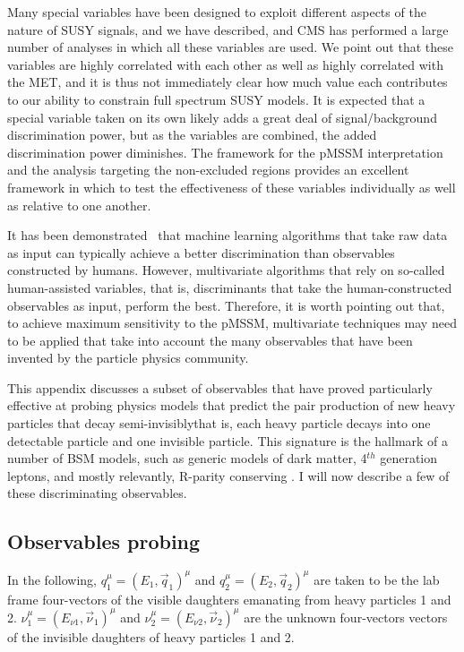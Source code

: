 Many special variables have been designed to exploit different aspects of the nature of SUSY signals, and we have described, and CMS has performed  a large number of analyses in which all these variables are used. We point out that these variables are highly correlated with each other as well as highly correlated with the MET, and it is thus not immediately clear how much value each contributes to our ability to constrain full spectrum SUSY models. It is expected that a special variable taken on its own likely adds a great deal of signal/background discrimination power, but as the variables are combined, the added discrimination power diminishes. The framework for the pMSSM interpretation and the analysis targeting the non-excluded regions provides an excellent framework in which to test the effectiveness of these variables individually as well as relative to one another. 

It has been demonstrated~\cite{bishop2012pattern} that machine learning algorithms that take raw data as input can typically achieve a better discrimination than observables constructed by humans. However, multivariate algorithms that rely on so-called human-assisted variables, that is, discriminants that take the human-constructed observables as input, perform the best. Therefore, it is worth pointing out that, to achieve maximum sensitivity to the pMSSM, multivariate techniques may need to be applied that take into account the many observables that have been invented by the particle physics community. 

This appendix discusses a subset of observables that have proved particularly effective at probing physics models that predict the pair production of new heavy particles that decay semi-invisibly\textemdash that is, each heavy particle decays into one detectable particle and one invisible particle. This signature is the hallmark of a number of BSM models, such as generic models of dark matter, 4$^{th}$ generation leptons, and mostly relevantly, R-parity conserving \SUSY. I will now describe a few of these discriminating observables.

\subsection{Observables probing \SUSY}

In the following, $q_1 ^\mu=(E_1, \vec{q}_1)^\mu$ and $q_2 ^\mu=(E_2, \vec{q}_2) ^\mu$ are taken to be the lab frame four-vectors of the visible daughters emanating from heavy particles 1 and 2. $\nu_1 ^\mu=(E_{\nu1}, \vec{\nu}_1)^\mu$ and $\nu_2 ^\mu=(E_{\nu2}, \vec{\nu}_2) ^\mu$ are the unknown four-vectors vectors of the invisible daughters of heavy particles 1 and 2. 

